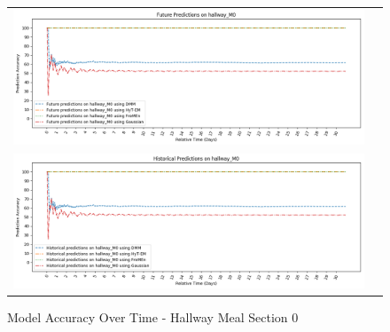 \begin{center}
\begin{figure}[!Hp]
  \begin{tabular}{cc}
    {\includegraphics[width = 6in]{images/results/Future_Predictions_on_hallway_M0.png}} \\
    {\includegraphics[width = 6in]{images/results/Historical_Predictions_on_hallway_M0.png}} \\
  \end{tabular}
  \caption{Model Accuracy Over Time - Hallway Meal Section 0}
\end{figure}




\end{center}
